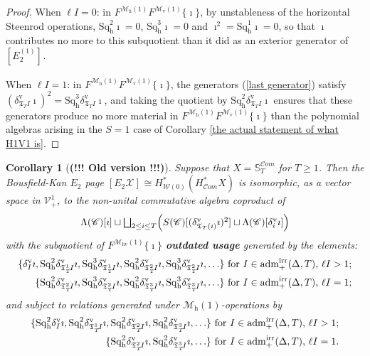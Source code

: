 \documentclass[11pt]{amsart} \renewcommand{\baselinestretch}{1.2}
\theoremstyle{plain}
\newtheorem{cor}[thm]{Corollary}
\theoremstyle{definition}
\newcommand{\scrC}{\mathscr{C}}
\newcommand{\calV}{\mathcal{V}}
\newcommand{\calw}{\mathcal{W}}
\newcommand{\calx}{\mathcal{X}}
\newcommand{\calMv}{\mathcal{M}\dver}
\newcommand{\calMh}{\mathcal{M}\dhor}
\newcommand{\calMhv}{\mathcal{M}_\mathrm{hv}}
\newcommand{\CommOperad}{{\scrC}}
\newcommand{\vect}[2]{\calV^{#1}_{#2}}
\newcommand{\aDTirr}{\mathrm{adm}_+^\mathrm{irr}(\Delta,T)}
\newcommand{\algs}{{\scrC\!\textit{om}}}
\newcommand{\TOP}{\mathfrak{T}}
\newcommand{\E}[5]{[E^{#1}_{#2}#3]^{#4}_{#5}}
\newcommand{\uver}{^\mathrm{v}}
\newcommand{\dver}{_\mathrm{v}}
\newcommand{\dhor}{_\mathrm{h}}
\newcommand{\Sqh}{\mathrm{Sq}\dhor}
\newcommand{\deltav}{\delta\uver}
\begin{document}
\begin{Calculations of HWn}
\begin{proof}
When $\ell I=0$: in $F^{\calMh(1)}F^{\calMv(1)}\{\imath\}$, by unstableness of the horizontal Steenrod operations, $\Sqh^2\imath=0$, $\Sqh^3\imath=0$ and $\imath^2=\Sqh^1\imath=0$, so that $\imath$ contributes no more to this subquotient than it did as an exterior generator of $\E{(1)}{2}{}{}{}$.

When  $\ell I=1$: in $F^{\calMh(1)}F^{\calMv(1)}\{\imath\}$, the generators (\ref{last generator}) satisfy
$(\deltav_{\TOP_T I}\imath)^{2}=\Sqh^3\deltav_{\TOP_T I}\imath$, and taking the quotient by $\Sqh^2\deltav_{\TOP_T I}\imath$ ensures that these generators produce no more material in $F^{\calMh(1)}F^{\calMv(1)}\{\imath\}$ than the polynomial algebras arising in the $S=1$ case of Corollary \ref{the actual statement of what H1V1 is}.
\end{proof}

\begin{shaded}\tiny
\begin{cor}[\textbf{(!!! Old version !!!)}]
Suppose that $X=\mathbb{S}_{T}^{\algs}$ for $T\geq1$. Then the Bousfield-Kan $E_2$ page $\E{}{2}{\calx}{}{}\cong H^*_{\calw(0)}(H^*_\algs X)$ is isomorphic, as a vector space in $\vect{1}{+}$, to the non-unital commutative algebra coproduct of
\[\Lambda(\CommOperad)[\imath]\sqcup \textstyle\bigsqcup_{2\leq i\leq T} \Bigl(S(\CommOperad) [(\deltav_{\TOP_T(i)}\imath)^{2}]\sqcup \Lambda(\CommOperad)[\deltav_i\imath]\Bigr)\]
with the subquotient of $F^{\calMhv(1)}\{\imath\}$ \textbf{outdated usage} generated by the elements:
\begin{alignat}{2}
\{\deltav_{I}\imath,
\Sqh^2\deltav_{\TOP_T^1\!I}\imath,\Sqh^3\deltav_{\TOP_T^1\!I}\imath,
\Sqh^2\deltav_{\TOP_T^2\!I}\imath,\Sqh^3\deltav_{\TOP_T^2\!I}\imath,
\ldots\}\textup{ for $I\in\aDTirr$, $\ell I>1$;}
\\
\{
\Sqh^2\deltav_{\TOP_T^2\!I}\imath,\Sqh^3\deltav_{\TOP_T^2\!I}\imath,
\Sqh^2\deltav_{\TOP_T^3\!I}\imath,\Sqh^3\deltav_{\TOP_T^3\!I}\imath,
\ldots\}\textup{ for $I\in\aDTirr$, $\ell I=1$;}
\end{alignat}
and subject to  relations generated under $\calMh(1)$-operations by
\begin{alignat}{2}
\{
\Sqh^2\deltav_{I}\imath,
\Sqh^2\deltav_{\TOP_T^1\!I}\imath,
\Sqh^2\deltav_{\TOP_T^2\!I}\imath,
\Sqh^2\deltav_{\TOP_T^3\!I}\imath,
\ldots\}\textup{ for $I\in\aDTirr$, $\ell I>1$;}
\\
\{
\Sqh^2\deltav_{\TOP_T^2\!I}\imath,
\Sqh^2\deltav_{\TOP_T^3\!I}\imath,
\ldots\}\textup{ for $I\in\aDTirr$, $\ell I=1$.}
\end{alignat}
\end{cor}
\end{shaded}




\end{Calculations of HWn}
\end{document}
